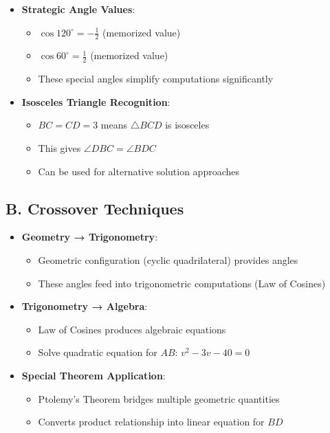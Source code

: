 \documentclass[11pt]{article}
\begin{document}
\begin{tacticalbox}
\begin{itemize}[leftmargin=*]
    \item \textbf{Strategic Angle Values}: 
    \begin{itemize}
        \item $\cos 120^\circ = -\frac{1}{2}$ (memorized value)
        \item $\cos 60^\circ = \frac{1}{2}$ (memorized value)
        \item These special angles simplify computations significantly
    \end{itemize}
    
    \item \textbf{Isosceles Triangle Recognition}: 
    \begin{itemize}
        \item $BC = CD = 3$ means $\triangle BCD$ is isosceles
        \item This gives $\angle DBC = \angle BDC$
        \item Can be used for alternative solution approaches
    \end{itemize}
\end{itemize}

\subsection*{B. Crossover Techniques}
\begin{itemize}[leftmargin=*]
    \item \textbf{Geometry → Trigonometry}: 
    \begin{itemize}
        \item Geometric configuration (cyclic quadrilateral) provides angles
        \item These angles feed into trigonometric computations (Law of Cosines)
    \end{itemize}
    
    \item \textbf{Trigonometry → Algebra}: 
    \begin{itemize}
        \item Law of Cosines produces algebraic equations
        \item Solve quadratic equation for $AB$: $v^2 - 3v - 40 = 0$
    \end{itemize}
    
    \item \textbf{Special Theorem Application}: 
    \begin{itemize}
        \item Ptolemy's Theorem bridges multiple geometric quantities
        \item Converts product relationship into linear equation for $BD$
    \end{itemize}
\end{itemize}
\end{tacticalbox}
\end{document}
